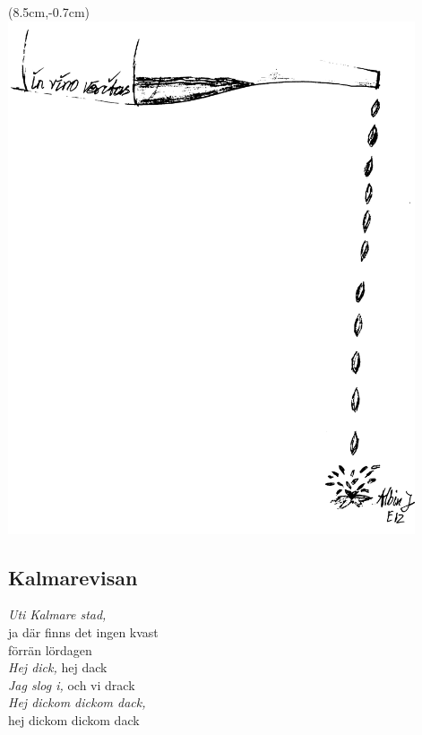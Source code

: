 \newpage


\begin{textblock*}{3cm}(8.5cm,-0.7cm) %
    \includegraphics[width=12cm]{./bilder/in_vino_veritas.png}
\end{textblock*}

\subsection*{Kalmarevisan} 

\noindent \textit{Uti Kalmare stad,} \\
\noindent ja där finns det ingen kvast \\
\noindent förrän lördagen \\

\noindent \textit{Hej dick,} hej dack\\
\noindent \textit{Jag slog i,} och vi drack\\
\noindent \textit{Hej dickom dickom dack,}\\
\noindent hej dickom dickom dack\\

